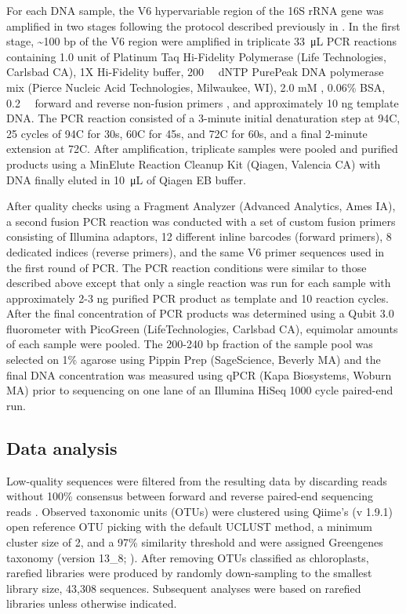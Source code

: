 For each DNA sample, the V6 hypervariable region of the 16S rRNA gene was amplified in two stages following the protocol described previously in \citet{Eren2013-ob}. In the first stage, \textasciitilde{}100 bp of the V6 region were amplified in triplicate \SI{33}{\micro\liter} PCR reactions containing 1.0 unit of Platinum Taq Hi-Fidelity Polymerase (Life Technologies, Carlsbad CA), 1X Hi-Fidelity buffer, \SI{200}{\micro\Molar} dNTP PurePeak DNA polymerase mix (Pierce Nucleic Acid Technologies, Milwaukee, WI), 2.0 mM , 0.06\% BSA, \SI{0.2}{\micro\Molar} forward and reverse non-fusion primers \citep{Eren2013-ob}, and approximately 10 ng template DNA. The PCR reaction consisted of a 3-minute initial denaturation step at 94\textdegree C, 25 cycles of 94\textdegree C for 30s, 60\textdegree C for 45s, and 72\textdegree C for 60s, and a final 2-minute extension at 72\textdegree C. After amplification, triplicate samples were pooled and purified products using a MinElute Reaction Cleanup Kit (Qiagen, Valencia CA) with DNA finally eluted in \SI{10}{\micro\liter} of Qiagen EB buffer.

After quality checks using a Fragment Analyzer (Advanced Analytics, Ames IA), a second fusion PCR reaction was conducted with a set of custom fusion primers consisting of Illumina adaptors, 12 different inline barcodes (forward primers), 8 dedicated indices (reverse primers), and the same V6 primer sequences used in the first round of PCR. The PCR reaction conditions were similar to those described above except that only a single reaction was run for each sample with approximately 2-3 ng purified PCR product as template and 10 reaction cycles. After the final concentration of PCR products was determined using a Qubit 3.0 fluorometer with PicoGreen (LifeTechnologies, Carlsbad CA), equimolar amounts of each sample were pooled. The 200-240 bp fraction of the sample pool was selected on 1\% agarose using Pippin Prep (SageScience, Beverly MA) and the final DNA concentration was measured using qPCR (Kapa Biosystems, Woburn MA) prior to sequencing on one lane of an Illumina HiSeq 1000 cycle paired-end run.

\subsection{Data analysis}\label{data-analysis}

Low-quality sequences were filtered from the resulting data by discarding reads without 100\% consensus between forward and reverse paired-end sequencing reads \citep{Eren2013-ob}. Observed taxonomic units (OTUs) were clustered using Qiime's (v 1.9.1) open reference OTU picking with the default UCLUST method, a minimum cluster size of 2, and a 97\% similarity threshold and were assigned Greengenes taxonomy (version 13\_8; \citealt{Caporaso2010-ee, Edgar2010-gq, McDonald2012-qf}). After removing OTUs classified as chloroplasts, rarefied libraries were produced by randomly down-sampling to the smallest library size, 43,308 sequences. Subsequent analyses were based on rarefied libraries unless otherwise indicated.

